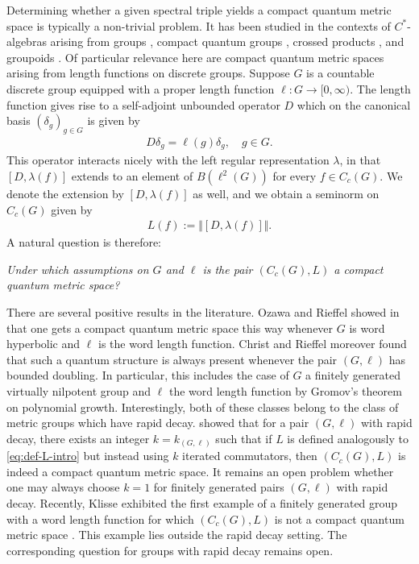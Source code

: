 \documentclass[12pt,a4paper,oneside,final,reqno]{amsart}
\theoremstyle{plain}
\theoremstyle{definition}
\begin{document}
Determining whether a given spectral triple yields a compact quantum metric space is typically a non-trivial problem. It has been studied in the contexts of $C^*$-algebras arising from groups \cite{Rieffel02, OzawaRieffel2005, ChristRieffel2017, ChristensenIvanRD, FarsiLandryLarsenPacker}, compact quantum groups \cite{BhowmickVoigtZacharias2015, AguilarKaad2018, KaadKyedSU2, AustadKyed2026}, crossed products \cite{BellissardMarcolliReihani2010, HawkinsSkalskiWhiteZacharias2013, KlisseCQMS, AustadKaadKyed2025, GerontogiannisMesland25}, and groupoids \cite{AustadGpdCQMS}. Of particular relevance here are compact quantum metric spaces arising from length functions on discrete groups. Suppose $G$ is a countable discrete group equipped with a proper length function $\ell \colon G \to [0,\infty)$. The length function gives rise to a self-adjoint unbounded operator $D$ which on the canonical basis $(\delta_g)_{g\in G}$ is given by
\begin{align*}
    D \delta_g = \ell(g) \delta_g, \quad g\in G.
\end{align*}
This operator interacts nicely with the left regular representation $\lambda$, in that $[D, \lambda(f)]$ extends to an element of $B(\ell^2(G))$ for every $f \in C_c(G)$. We denote the extension by $[D , \lambda(f)]$ as well, and we obtain a seminorm on $C_c(G)$ given by
\begin{align}\label{eq:def-L-intro}
    L(f) := \Vert [D, \lambda(f)]\Vert .
\end{align}
A natural question is therefore:
\begin{center}
    \emph{Under which assumptions on $G$ and $\ell$ is the pair $(C_c(G), L)$ a compact quantum metric space?}
\end{center}
There are several positive results in the literature. Ozawa and Rieffel showed in \cite{OzawaRieffel2005} that one gets a compact quantum metric space this way whenever $G$ is word hyperbolic and $\ell$ is the word length function. Christ and Rieffel \cite{ChristRieffel2017} moreover found that such a quantum structure is always present whenever the pair $(G,\ell)$ has bounded doubling. In particular, this includes the case of $G$ a finitely generated virtually nilpotent group and $\ell$ the word length function by Gromov's theorem on polynomial growth. Interestingly, both of these classes belong to the class of metric groups which have rapid decay. \cite{ChristensenIvanRD} showed that for a pair $(G,\ell)$ with rapid decay, there exists an integer $k = k_{(G,\ell)}$ such that if $L$ is defined analogously to \eqref{eq:def-L-intro} but instead using $k$ iterated commutators, then $(C_c(G), L)$ is indeed a compact quantum metric space. It remains an open problem whether one may always choose $k=1$ for finitely generated pairs $(G,\ell)$ with rapid decay. Recently, Klisse exhibited the first example of a finitely generated group with a word length function for which $(C_c(G), L)$ is not a compact quantum metric space \cite{Klisse26}. This example lies outside the rapid decay setting.  The corresponding question for groups with rapid decay remains open.
\end{document}
